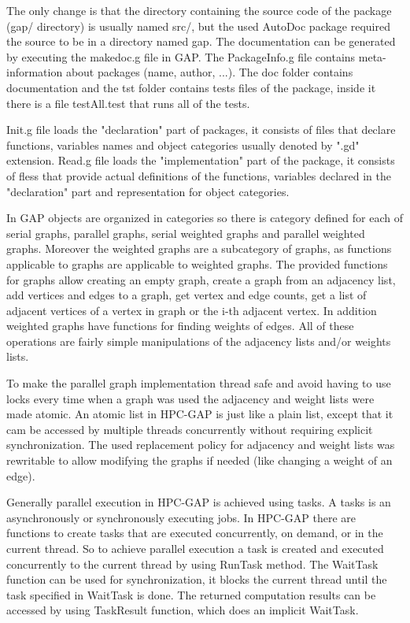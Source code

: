 \documentclass{report}
\theoremstyle{plain}
\theoremstyle{definition}
\theoremstyle{remark}
\begin{document}
The only change is that the directory containing the source code of the package (gap/ directory) is usually named src/, but the used AutoDoc package required the source to be in a directory named gap. The documentation can be generated by executing the makedoc.g file in GAP.
The PackageInfo.g file contains meta-information about packages (name, author, ...). The doc folder contains documentation and the tst folder contains tests files of the package, inside it there is a file testAll.test that runs all of the tests.

Init.g file loads the "declaration" part of packages, it consists of files that declare functions, variables names and object categories usually denoted by ".gd" extension. Read.g file loads the "implementation" part of the package, it consists of fless that provide actual definitions of the functions, variables declared in the "declaration" part and representation for object categories.

In GAP objects are organized in categories so there is category defined for each of serial graphs, parallel graphs, serial weighted graphs and parallel weighted graphs. Moreover the weighted graphs are a subcategory of graphs, as functions applicable to graphs are applicable to weighted graphs. The provided functions for graphs allow creating an empty graph, create a graph from an adjacency list, add vertices and edges to a graph, get vertex and edge counts, get a list of adjacent vertices of a vertex in graph or the i-th adjacent vertex. In addition weighted graphs have functions for finding weights of edges. All of these operations are fairly simple manipulations of the adjacency lists and/or weights lists.

To make the parallel graph implementation thread safe and avoid having to use locks every time when a graph was used the adjacency and weight lists were made atomic. An atomic list in HPC-GAP is just like a plain list, except that it cam be accessed by multiple threads concurrently without requiring explicit synchronization. The used replacement policy for adjacency and weight lists was rewritable to allow modifying the graphs if needed (like changing a weight of an edge).

Generally parallel execution in HPC-GAP is achieved using tasks. A tasks is an asynchronously or synchronously executing jobs. In HPC-GAP there are functions to create tasks that are executed concurrently, on demand, or in the current thread. So to achieve parallel execution a task is created and executed concurrently to the current thread by using RunTask method. The WaitTask function can be used for synchronization, it blocks the current thread until the task specified in WaitTask is done. The returned computation results can be accessed by using TaskResult function, which does an implicit WaitTask.
\end{document}
